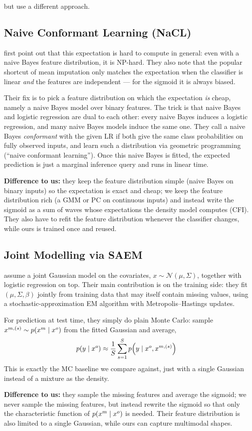 but use a different approach.

\subsection{Naive Conformant Learning (NaCL)}

\citet{khosravi2019expect} first point out that this expectation is hard
to compute in general: even with a naive Bayes feature distribution, it
is NP-hard. They also note that the popular shortcut of mean imputation
only matches the expectation when the classifier is linear \emph{and} the
features are independent --- for the sigmoid it is always biased.

Their fix is to pick a feature distribution on which the expectation
\emph{is} cheap, namely a naive Bayes model over binary features. The
trick is that naive Bayes and logistic regression are dual to each other:
every naive Bayes induces a logistic regression, and many naive Bayes
models induce the same one. They call a naive Bayes \textit{conformant}
with the given LR if both give the same class probabilities on fully
observed inputs, and learn such a distribution via geometric programming
(``naive conformant learning''). Once this naive Bayes is fitted, the
expected prediction is just a marginal inference query and runs in linear
time.

\medskip
\noindent\textbf{Difference to us:} they keep the feature distribution
simple (naive Bayes on binary inputs) so the expectation is exact and
cheap; we keep the feature distribution rich (a GMM or PC on continuous
inputs) and instead write the sigmoid as a sum of waves whose expectations the density model computes (CFI). They
also have to refit the feature distribution whenever the classifier
changes, while ours is trained once and reused.

\subsection{Joint Modelling via SAEM}

\citet{jiang2020logreg} assume a joint Gaussian model on the covariates,
$x \sim \mathcal{N}(\mu, \Sigma)$, together with logistic regression on
top. Their main contribution is on the training side: they fit
$(\mu, \Sigma, \beta)$ jointly from training data that may itself contain
missing values, using a stochastic-approximation EM algorithm with
Metropolis--Hastings updates.

For prediction at test time, they simply do plain Monte Carlo: sample
$x^{m,(s)} \sim p(x^m \mid x^o)$ from the fitted Gaussian and average,
\[
  p(y \mid x^o) \approx \frac{1}{S} \sum_{s=1}^{S} p\!\left(y \mid x^o, x^{m,(s)}\right)
\]
This is exactly the MC baseline we compare against, just with a single
Gaussian instead of a mixture as the density.

\medskip
\noindent\textbf{Difference to us:} they sample the missing features and
average the sigmoid; we never sample the missing features, but instead
rewrite the sigmoid so that only the characteristic function of
$p(x^m \mid x^o)$ is needed. Their feature distribution is also limited
to a single Gaussian, while ours can capture multimodal shapes.
